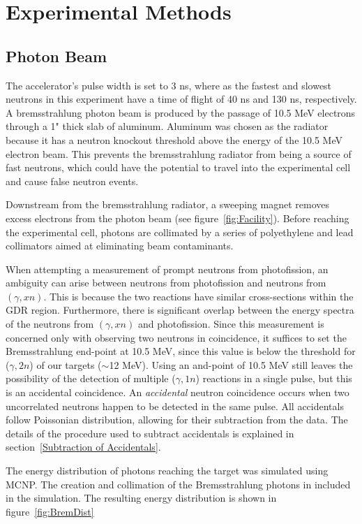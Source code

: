 \section{Experimental Methods}
\subsection{Photon Beam}
The accelerator's pulse width is set to 3 ns, where as the fastest and slowest neutrons in this experiment have a time of flight of 40 ns and 130 ns, respectively. A bremsstrahlung photon beam is produced by the passage of 10.5 MeV electrons through a 1" thick slab of aluminum. Aluminum was chosen as the radiator because it has a neutron knockout threshold above the energy of the 10.5 MeV electron beam. This prevents the bremsstrahlung radiator from being a source of fast neutrons, which could have the potential to travel into the experimental cell and cause false neutron events.

Downstream from the bremsstrahlung radiator, a sweeping magnet removes excess electrons from the photon beam (see figure~\ref{fig:Facility}). Before reaching the experimental cell, photons are collimated by a series of polyethylene and lead collimators aimed at eliminating beam contaminants.

When attempting a measurement of prompt neutrons from photofission, an ambiguity can arise between neutrons from photofission and neutrons from $(\gamma, xn)$. This is because the two reactions have similar cross-sections within the GDR region. Furthermore, there is significant overlap between the energy spectra of the neutrons from $(\gamma, xn)$ and photofission. Since this measurement is concerned only with observing two neutrons in coincidence, it suffices to set the Bremsstrahlung end-point at 10.5 MeV, since this value is below the threshold for ($\gamma, 2n$) of our targets ($\sim$12 MeV). Using an and-point of 10.5 MeV still leaves the possibility of the detection of multiple ($\gamma, 1n$) reactions in a single pulse, but this is an accidental coincidence. An \textit{accidental} neutron coincidence occurs when two uncorrelated neutrons happen to be detected in the same pulse. All accidentals follow Poissonian distribution, allowing for their subtraction from the data. The details of the procedure used to subtract accidentals is explained in section~\ref{Subtraction of Accidentals}.

The energy distribution of photons reaching the target was simulated using MCNP. The creation and collimation of the Bremsstrahlung photons in included in the simulation. The resulting energy distribution is shown in figure~\ref{fig:BremDist}

